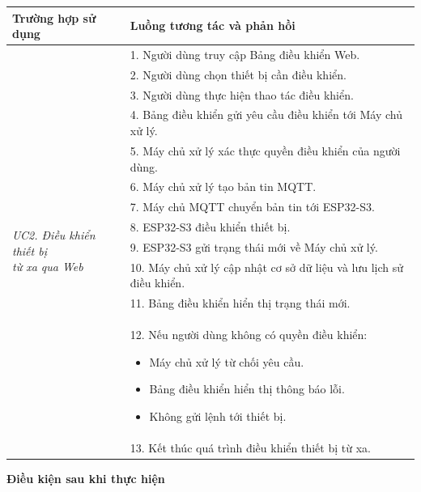 \documentclass[a4paper,12pt]{article}
\begin{document}
\begin{tabularx}{\linewidth}{|p{4cm}|X|}
\hline
\textbf{Trường hợp sử dụng} &
\textbf{Luồng tương tác và phản hồi} \\
\hline

\multirow{13}{=}{\parbox{3.2cm}{\centering\textit{UC2. Điều khiển thiết bị\\từ xa qua Web}}}
&
1. Người dùng truy cập Bảng điều khiển Web. \\

&
2. Người dùng chọn thiết bị cần điều khiển. \\

&
3. Người dùng thực hiện thao tác điều khiển. \\

&
4. Bảng điều khiển gửi yêu cầu điều khiển tới Máy chủ xử lý. \\

&
5. Máy chủ xử lý xác thực quyền điều khiển của người dùng. \\

&
6. Máy chủ xử lý tạo bản tin MQTT. \\

&
7. Máy chủ MQTT chuyển bản tin tới ESP32-S3. \\

&
8. ESP32-S3 điều khiển thiết bị. \\

&
9. ESP32-S3 gửi trạng thái mới về Máy chủ xử lý. \\

&
10. Máy chủ xử lý cập nhật cơ sở dữ liệu và lưu lịch sử điều khiển. \\

&
11. Bảng điều khiển hiển thị trạng thái mới. \\

&
12. Nếu người dùng không có quyền điều khiển:
\begin{itemize}
    \item Máy chủ xử lý từ chối yêu cầu.
    \item Bảng điều khiển hiển thị thông báo lỗi.
    \item Không gửi lệnh tới thiết bị.
\end{itemize}
\\

&
13. Kết thúc quá trình điều khiển thiết bị từ xa. \\
\hline
\end{tabularx}

\textbf{Điều kiện sau khi thực hiện}
\end{document}
